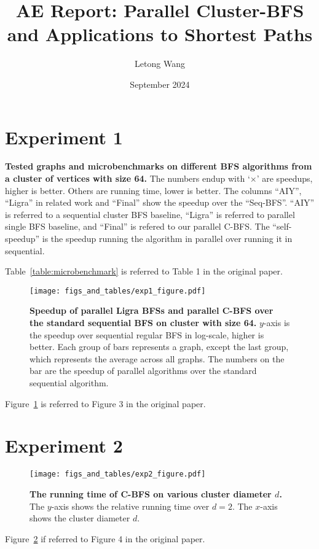 \documentclass{article}
\title{AE Report: Parallel Cluster-BFS and Applications to Shortest Paths}
\author{Letong Wang}
\date{September 2024}
\begin{document}
\maketitle

\section{Experiment 1}
\begin{table}[htbp]
  \centering
  \footnotesize
  
  \caption{\small\textbf{
    Tested graphs and microbenchmarks on different BFS algorithms from a cluster of vertices with size 64. 
  }
  The numbers endup with `$\times$' are speedups, higher is better. Others are running time, lower is better. The columns ``AIY'', ``Ligra'' in related work and ``Final'' show the speedup over the ``Seq-BFS''. ``AIY'' is referred to a sequential cluster BFS baseline, ``Ligra'' is referred to parallel single BFS baseline, and ``Final'' is refered to our parallel C-BFS.  The ``self-speedup'' is the speedup running the algorithm in parallel over running it in sequential. 
  \label{table:microbenchmark}
  }
\end{table}
Table~\ref{table:microbenchmark} is referred to Table 1 in the original paper.

\begin{figure}[htbp]
  \centering
  \texttt{[image: figs\_and\_tables/exp1\_figure.pdf]}
  \caption{\small\textbf{Speedup of parallel Ligra BFSs and parallel C-BFS over the standard sequential BFS on cluster with size 64.} $y$-axis is the speedup over sequential regular BFS in log-scale, higher is better. Each group of bars represents a graph, except the last group, which represents the average across all graphs. The numbers on the bar are the speedup of parallel algorithms over the standard sequential algorithm.  
  \label{fig:par_compare}
  }
\end{figure} 
Figure~\ref{fig:par_compare} is referred to Figure 3 in the original paper.

\section{Experiment 2}
\begin{figure}[htbp]
  \centering
  \texttt{[image: figs\_and\_tables/exp2\_figure.pdf]}
  \caption{\small \textbf{The running time of C-BFS on various cluster diameter $d$.}
  The $y$-axis shows the relative running time over $d=2$. The $x$-axis shows the cluster diameter $d$. 
  }
  \label{fig:ccbfs_d}
\end{figure} 
Figure~\ref{fig:ccbfs_d} if referred to Figure 4 in the original paper.
\end{document}

